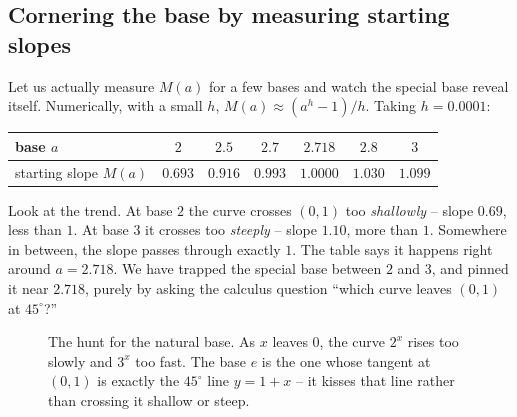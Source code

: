 \subsection{Cornering the base by measuring starting slopes}

Let us actually measure $M(a)$ for a few bases and watch the special base reveal itself. Numerically, with a small $h$, $M(a)\approx (a^h-1)/h$. Taking $h=0.0001$:

\begin{center}
\begin{tabular}{@{}lcccccc@{}}
\toprule
base $a$ & $2$ & $2.5$ & $2.7$ & $2.718$ & $2.8$ & $3$ \\
\midrule
starting slope $M(a)$ & $0.693$ & $0.916$ & $0.993$ & $1.0000$ & $1.030$ & $1.099$ \\
\bottomrule
\end{tabular}
\end{center}

Look at the trend. At base $2$ the curve crosses $(0,1)$ too \emph{shallowly} -- slope $0.69$, less than $1$. At base $3$ it crosses too \emph{steeply} -- slope $1.10$, more than $1$. Somewhere in between, the slope passes through exactly $1$. The table says it happens right around $a=2.718$. We have trapped the special base between $2$ and $3$, and pinned it near $2.718$, purely by asking the calculus question ``which curve leaves $(0,1)$ at $45^\circ$?''

\begin{figure}[H]
\centering
{}
\caption{The hunt for the natural base. As $x$ leaves $0$, the curve $2^x$ rises too slowly and $3^x$ too fast. The base $e$ is the one whose tangent at $(0,1)$ is exactly the $45^\circ$ line $y=1+x$ -- it kisses that line rather than crossing it shallow or steep.}
\label{ch03:fig-slope-one}
\end{figure}

